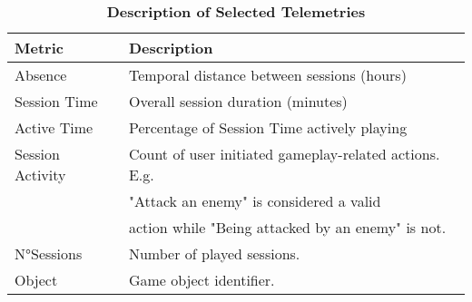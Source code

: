 \begin{table}[H] \centering
\caption{\textbf{Description of Selected Telemetries}}
\label{metricsdescription_2}
  \begin{tabularx}{\textwidth}{@{}lX@{}}
    \toprule
    \textbf{Metric}      & \textbf{Description}          \\ \midrule
    {Absence}    & Temporal distance between sessions (hours)  \\
    {Session Time}     & Overall session duration (minutes)       \\ 
    {Active Time}      & Percentage of Session Time actively playing  \\ 
    {Session Activity}    & Count of user initiated gameplay-related actions. E.g.\\ 
                & "Attack an enemy" is considered a valid\\ 
                & action while "Being attacked by an enemy" is not.\\
    {N°Sessions}    & Number of played sessions.\\ 
    {Object}    &  Game object identifier.  \\
    \bottomrule
  \end{tabularx}
\end{table}